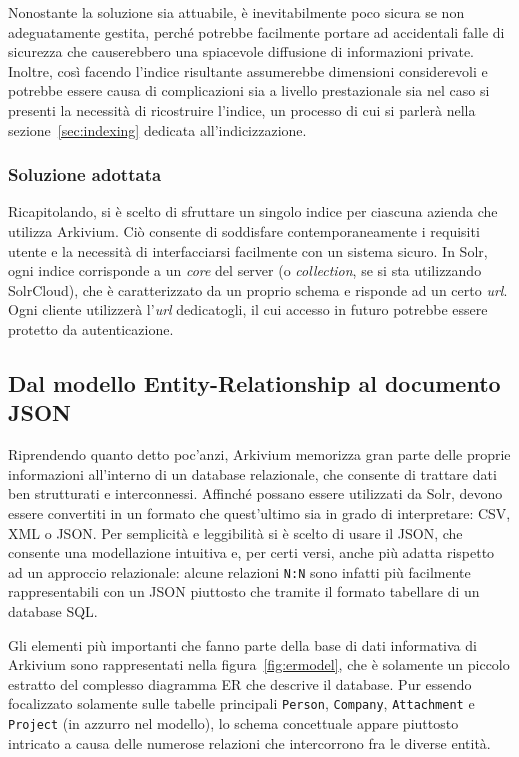 Nonostante la soluzione sia attuabile, è inevitabilmente poco sicura se non adeguatamente gestita, perché potrebbe facilmente portare ad accidentali falle di sicurezza che causerebbero una spiacevole diffusione di informazioni private. Inoltre, così facendo l’indice risultante assumerebbe dimensioni considerevoli e potrebbe essere causa di complicazioni sia a livello prestazionale sia nel caso si presenti la necessità di ricostruire l’indice, un processo di cui si parlerà nella sezione~\ref{sec:indexing} dedicata all’indicizzazione.


\subsubsection{Soluzione adottata}

Ricapitolando, si è scelto di sfruttare un singolo indice per ciascuna azienda che utilizza Arkivium. Ciò consente di soddisfare contemporaneamente i requisiti utente e la necessità di interfacciarsi facilmente con un sistema sicuro. In Solr, ogni indice corrisponde a un \textit{core} del server (o \textit{collection}, se si sta utilizzando SolrCloud), che è caratterizzato da un proprio schema e risponde ad un certo \textit{url}. Ogni cliente utilizzerà l’\textit{url} dedicatogli, il cui accesso in futuro potrebbe essere protetto da autenticazione.



\subsection{Dal modello Entity-Relationship al documento JSON}
\label{sec:modelling}

Riprendendo quanto detto poc’anzi, Arkivium memorizza gran parte delle proprie informazioni all’interno di un database relazionale, che consente di trattare dati ben strutturati e interconnessi. Affinché possano essere utilizzati da Solr, devono essere convertiti in un formato che quest’ultimo sia in grado di interpretare: CSV, XML o JSON. Per semplicità e leggibilità si è scelto di usare il JSON, che consente una modellazione intuitiva e, per certi versi, anche più adatta rispetto ad un approccio relazionale: alcune relazioni \texttt{N:N} sono infatti più facilmente rappresentabili con un JSON piuttosto che tramite il formato tabellare di un database SQL.

Gli elementi più importanti che fanno parte della base di dati informativa di Arkivium sono rappresentati nella figura~\ref{fig:ermodel}, che è solamente un piccolo estratto del complesso diagramma ER che descrive il database. Pur essendo focalizzato solamente sulle tabelle principali \texttt{Person}, \texttt{Company}, \texttt{Attachment} e \texttt{Project} (in azzurro nel modello), lo schema concettuale appare piuttosto intricato a causa delle numerose relazioni che intercorrono fra le diverse entità.

